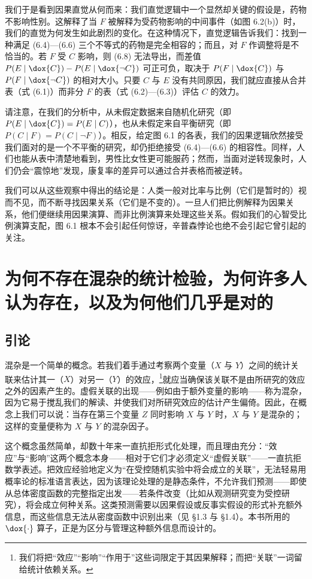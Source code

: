 我们于是看到因果直觉从何而来：我们直觉逻辑中一个显然却关键的假设是，药物不影响性别。这解释了当 $F$ 被解释为受药物影响的中间事件（如图 6.2(b)）时，我们的直觉为何发生如此剧烈的变化。在这种情况下，直觉逻辑告诉我们：找到一种满足 \textup{(6.4)}—\textup{(6.6)} 三个不等式的药物是完全相容的；而且，对 $F$ 作调整将是不恰当的。若 $F$ 受 $C$ 影响，则 \textup{(6.8)} 无法导出，而差值 $P(E\mid \dox{C})-P(E\mid \dox{\neg C})$ 可正可负，取决于 $P(F\mid \dox{C})$ 与 $P(F\mid \dox{\neg C})$ 的相对大小。只要 $C$ 与 $E$ 没有共同原因，我们就应直接从合并表（式 \textup{(6.1)}）而非分 $F$ 的表（式 \textup{(6.2)}—\textup{(6.3)}）评估 $C$ 的效力。

请注意，在我们的分析中，从未假定数据来自随机化研究（即 $P(E\mid \dox{C})=P(E\mid C)$），也从未假定来自平衡研究（即 $P(C\mid F)=P(C\mid \neg F)$）。相反，给定图 6.1 的各表，我们的因果逻辑欣然接受我们面对的是一个不平衡的研究，却仍拒绝接受 \textup{(6.4)}—\textup{(6.6)} 的相容性。同样，人们也能从表中清楚地看到，男性比女性更可能服药；然而，当面对逆转现象时，人们仍会“震惊地”发现，康复率的差异可以通过合并表格而被逆转。

我们可以从这些观察中得出的结论是：人类一般对比率与比例（它们是暂时的）视而不见，而不断寻找因果关系（它们是不变的）。一旦人们把比例解释为因果关系，他们便继续用因果演算、而非比例演算来处理这些关系。假如我们的心智受比例演算支配，图 6.1 根本不会引起任何惊讶，辛普森悖论也绝不会引起它曾引起的关注。



\section{为何不存在混杂的统计检验，为何许多人认为存在，以及为何他们几乎是对的}

\subsection{引论}

混杂是一个简单的概念。若我们着手通过考察两个变量（$X$ 与 $Y$）之间的统计关联来估计其一（$X$）对另一（$Y$）的效应，\footnote{我们将把“效应”“影响”“作用于”这些词限定于其因果解释；而把“关联”一词留给统计依赖关系。}就应当确保该关联不是由所研究的效应之外的因素产生的。虚假关联的出现——例如由于额外变量的影响——称为混杂，因为它易于搅乱我们的解读、并使我们对所研究效应的估计产生偏倚。因此，在概念上我们可以说：当存在第三个变量 $Z$ 同时影响 $X$ 与 $Y$ 时，$X$ 与 $Y$ 是混杂的；这样的变量便称为 $X$ 与 $Y$ 的混杂因子。

这个概念虽然简单，却数十年来一直抗拒形式化处理，而且理由充分：“效应”与“影响”这两个概念本身——相对于它们才必须定义“虚假关联”——一直抗拒数学表述。把效应经验地定义为“在受控随机实验中将会成立的关联”，无法轻易用概率论的标准语言表达，因为该理论处理的是静态条件，不允许我们预测——即使从总体密度函数的完整指定出发——若条件改变（比如从观测研究变为受控研究），将会成立何种关系。这类预测需要以因果假设或反事实假设的形式补充额外信息，而这些信息无法从密度函数中识别出来（见 \S 1.3 与 \S 1.4）。本书所用的 $\dox{\cdot}$ 算子，正是为区分与管理这种额外信息而设计的。

